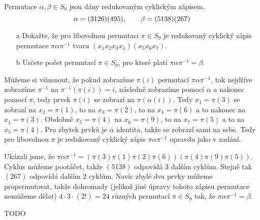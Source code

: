 \documentclass[12pt]{article}					%
\begin{document}
    \begin{priklad}[12.2]
        Permutace $\alpha, \beta \in S_9$ jsou dány redukovaným cyklickým zápisem.
        $$ \alpha = (3 1 2 6)(4 9 5), \hskip 2em \beta = (5 1 3 8)(2 6 7) $$

        \begin{itemize}
            \item[a] Dokažte, že pro libovolnou permutaci $\pi \in S_9$ je redukovaný cyklický zápis permutace $\pi \alpha \pi^{-1}$ tvaru $(x_1 x_2 x_3 x_4)(x_5 x_6 x_7)$.
            \item[b] Určete počet permutací $\pi \in S_9$, pro které platí $\pi\alpha\pi^{−1} = \beta$.
        \end{itemize}

        \begin{dukazin}[a]
            Můžeme si všimnout, že pokud zobrazíme $\pi(i)$ permutací $\pi\alpha\pi^{-1}$, tak nejdříve zobrazíme $\pi^{-1}$ na $\pi^{-1}(\pi(i)) = i$, následně zobrazíme pomocí $\alpha$ a nakonec pomocí $\pi$, tedy prvek $\pi(i)$ se zobrazí na $\pi(\alpha(i))$. Tedy $x_1 = \pi(3)$ se zobrazí na $x_2 = \pi(1)$, to na $x_3 = \pi(2)$, to na $x_4 = \pi(6)$ a to nakonec na $x_1 = \pi(3)$. Obdobně $x_5 = \pi(4)$ na $x_6 = \pi(9)$, to na $x_7 = \pi(5)$ a to na $x_5 = \pi(4)$. Pro zbytek prvků je $\alpha$ identita, takže se zobrazí sami na sebe. Tedy pro libovolnou $\pi$ je redukovaný cyklický zápis $\pi\alpha\pi^{-1}$ opravdu jako v zadání.
        \end{dukazin}

        \begin{reseni}[b]
            Ukázali jsme, že $\pi\alpha\pi^{-1} = (\pi(3) \pi(1) \pi(2) \pi(6)) (\pi(4) \pi(9) \pi(5))$. Cyklus můžeme pootáčet, takže $(5 1 3 8)$ odpovídá 3 dalším cyklům. Stejně tak $(2 6 7)$ odpovídá dalším 2 cyklům. Navíc zbylé dva prvky můžeme propermutovat, takže dohromady (jelikož jiné úpravy tohoto zápisu permutace nemůžeme dělat) $4·3·(2!) = 24$ různých permutací $\pi \in S_9$ tak, že $\pi\alpha\pi^{-1} = \beta$.
        \end{reseni}
    \end{priklad}

\pagebreak

    \begin{priklad}[12.*]
        TODO
    \end{priklad}
\end{document}
